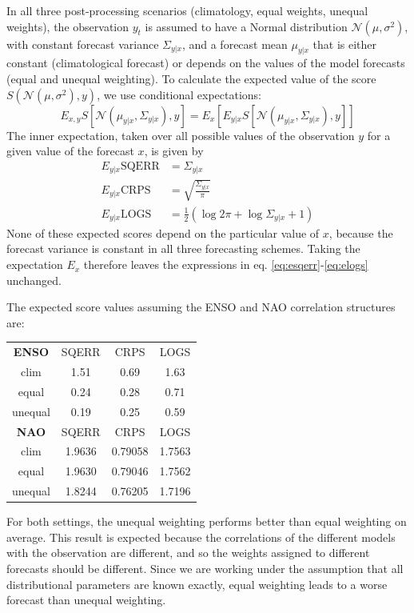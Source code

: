 \documentclass[12pt]{article}
\begin{document}
In all three post-processing scenarios (climatology, equal weights, unequal weights), the observation $y_t$ is assumed to have a Normal distribution $\mathcal{N}(\mu, \sigma^2)$, with constant forecast variance $\Sigma_{y|x}$, and a forecast mean $\mu_{y|x}$ that is either constant (climatological forecast) or depends on the values of the model forecasts (equal and unequal weighting).
To calculate the expected value of the score $S(\mathcal{N}(\mu,\sigma^2),y)$, we use conditional expectations:
%
\begin{equation}
E_{x,y}S\left[\mathcal{N}(\mu_{y|x},\Sigma_{y|x}),y\right] = E_x\left[ E_{y|x} S\left[\mathcal{N}(\mu_{y|x},\Sigma_{y|x}), y\right]\right]
\end{equation}
%
The inner expectation, taken over all possible values of the observation $y$ for a given value of the forecast $x$, is given by
%
\begin{align}
E_{y|x} \mathrm{SQERR} & = \Sigma_{y|x}\label{eq:esqerr}\\
E_{y|x} \mathrm{CRPS} & = \sqrt{\frac{\Sigma_{y|x}}{\pi}}\label{eq:ecrps}\\
E_{y|x} \mathrm{LOGS} & = \frac12\left( \log2\pi + \log\Sigma_{y|x} +1\right)\label{eq:elogs}
\end{align}
%
None of these expected scores depend on the particular value of $x$, because the forecast variance is constant in all three forecasting schemes.
Taking the expectation $E_x$ therefore leaves the expressions in eq. \ref{eq:esqerr}-\ref{eq:elogs} unchanged.


The expected score values assuming the ENSO and NAO correlation structures are:
%
\begin{center}
\begin{tabular}{cccc}
\textbf{ENSO} & SQERR & CRPS  & LOGS\\
clim    & 1.51 & 0.69 & 1.63\\
equal   & 0.24 & 0.28 & 0.71\\
unequal & 0.19 & 0.25 & 0.59\\
\hline
\textbf{NAO} & SQERR    & CRPS    & LOGS\\
clim    & 1.9636 & 0.79058 & 1.7563\\
equal   & 1.9630 & 0.79046 & 1.7562\\
unequal & 1.8244 & 0.76205 & 1.7196
\end{tabular}
\end{center}

For both settings, the unequal weighting performs better than equal weighting on average.
This result is expected because the correlations of the different models with the observation are different, and so the weights assigned to different forecasts should be different.
Since we are working under the assumption that all distributional parameters are known exactly, equal weighting leads to a worse forecast than unequal weighting.
\end{document}

